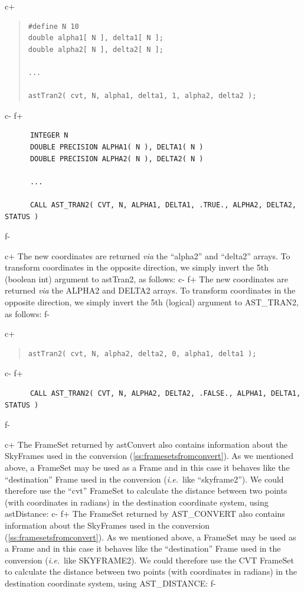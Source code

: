 \documentclass[twoside,11pt]{article}
\newcommand{\secref}[1]{\S\ref{#1}}
\renewcommand{\secref}[1]{\ref{#1}}
\begin{document}
c+
\begin{quote}
\small
\begin{verbatim}
#define N 10
double alpha1[ N ], delta1[ N ];
double alpha2[ N ], delta2[ N ];

...

astTran2( cvt, N, alpha1, delta1, 1, alpha2, delta2 );
\end{verbatim}
\normalsize
\end{quote}
c-
f+
\small
\begin{verbatim}
      INTEGER N
      DOUBLE PRECISION ALPHA1( N ), DELTA1( N )
      DOUBLE PRECISION ALPHA2( N ), DELTA2( N )

      ...

      CALL AST_TRAN2( CVT, N, ALPHA1, DELTA1, .TRUE., ALPHA2, DELTA2, STATUS )
\end{verbatim}
\normalsize
f-

c+
The new coordinates are returned {\em{via}} the ``alpha2'' and
``delta2'' arrays.  To transform coordinates in the opposite
direction, we simply invert the 5th (boolean int) argument to
astTran2, as follows:
c-
f+
The new coordinates are returned {\em{via}} the ALPHA2 and DELTA2
arrays.  To transform coordinates in the opposite direction, we simply
invert the 5th (logical) argument to AST\_TRAN2, as follows:
f-

c+
\begin{quote}
\small
\begin{verbatim}
astTran2( cvt, N, alpha2, delta2, 0, alpha1, delta1 );
\end{verbatim}
\normalsize
\end{quote}
c-
f+
\small
\begin{verbatim}
      CALL AST_TRAN2( CVT, N, ALPHA2, DELTA2, .FALSE., ALPHA1, DELTA1, STATUS )
\end{verbatim}
\normalsize
f-

c+
The FrameSet returned by astConvert also contains information about
the SkyFrames used in the conversion
(\secref{ss:framesetsfromconvert}). As we mentioned above, a FrameSet
may be used as a Frame and in this case it behaves like the
``destination'' Frame used in the conversion ({\em{i.e.}}\ like
``skyframe2'').  We could therefore use the ``cvt'' FrameSet to
calculate the distance between two points (with coordinates in
radians) in the destination coordinate system, using astDistance:
c-
f+
The FrameSet returned by AST\_CONVERT also contains information about
the SkyFrames used in the conversion
(\secref{ss:framesetsfromconvert}). As we mentioned above, a FrameSet
may be used as a Frame and in this case it behaves like the
``destination'' Frame used in the conversion ({\em{i.e.}}\ like
SKYFRAME2). We could therefore use the CVT FrameSet to calculate the
distance between two points (with coordinates in radians) in the
destination coordinate system, using AST\_DISTANCE:
f-
\end{document}
